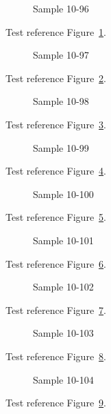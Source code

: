 \begin{figure}[tbhp]
\caption{Sample 10-96}
\label{fig:sample-10-96}
\end{figure}

Test reference Figure~\ref{fig:sample-10-96}.

\begin{figure}[tbhp]
\caption{Sample 10-97}
\label{fig:sample-10-97}
\end{figure}

Test reference Figure~\ref{fig:sample-10-97}.

\begin{figure}[tbhp]
\caption{Sample 10-98}
\label{fig:sample-10-98}
\end{figure}

Test reference Figure~\ref{fig:sample-10-98}.

\begin{figure}[tbhp]
\caption{Sample 10-99}
\label{fig:sample-10-99}
\end{figure}

Test reference Figure~\ref{fig:sample-10-99}.

\begin{figure}[tbhp]
\caption{Sample 10-100}
\label{fig:sample-10-100}
\end{figure}

Test reference Figure~\ref{fig:sample-10-100}.

\begin{figure}[tbhp]
\caption{Sample 10-101}
\label{fig:sample-10-101}
\end{figure}

Test reference Figure~\ref{fig:sample-10-101}.

\begin{figure}[tbhp]
\caption{Sample 10-102}
\label{fig:sample-10-102}
\end{figure}

Test reference Figure~\ref{fig:sample-10-102}.

\begin{figure}[tbhp]
\caption{Sample 10-103}
\label{fig:sample-10-103}
\end{figure}

Test reference Figure~\ref{fig:sample-10-103}.

\begin{figure}[tbhp]
\caption{Sample 10-104}
\label{fig:sample-10-104}
\end{figure}

Test reference Figure~\ref{fig:sample-10-104}.

